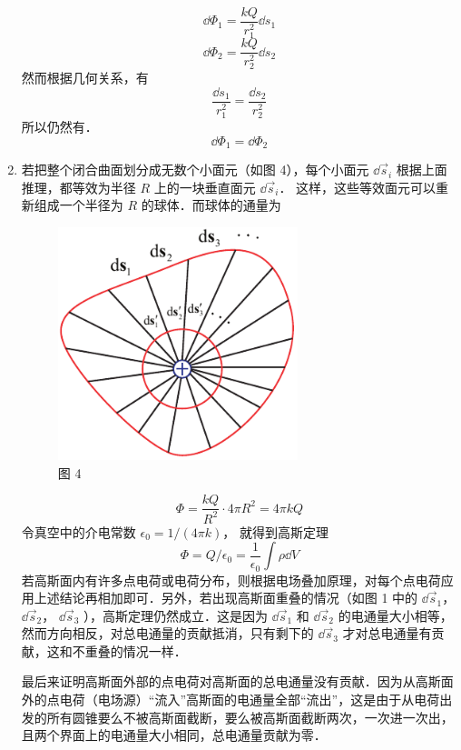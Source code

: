 \begin{enumerate}
\begin{equation}
\dd{\Phi_1} = \frac{kQ}{r_1^2} \dd{s_1}
\end{equation}
\begin{equation}
\dd{\Phi_2} = \frac{kQ}{r_2^2} \dd{s_2}
\end{equation}             
然而根据几何关系，有
\begin{equation}
\frac{\dd{s_1}}{r_1^2} = \frac{\dd{s_2}}{r_2^2}
\end{equation} 
所以仍然有．
\begin{equation}
\dd{\Phi_1} = \dd{\Phi_2}
\end{equation} 
\item 若把整个闭合曲面划分成无数个小面元（如图 4），每个小面元 $\dd{\vec s_i}$ 根据上面推理，都等效为半径 $R$ 上的一块垂直面元 $\dd{\vec s_i}$． 这样，这些等效面元可以重新组成一个半径为 $R$ 的球体．而球体的通量为
\begin{figure}[ht]
\centering
\includegraphics[width=7cm]{./figures/EGauss4.pdf}
\caption{图 4}
\end{figure}

\begin{equation}
\Phi  = \frac{kQ}{R^2} \cdot 4\pi R^2 = 4\pi kQ
\end{equation} 
令真空中的介电常数 $\epsilon_0 = 1/(4\pi k)$， 就得到高斯定理
\begin{equation}
\Phi  = Q/\epsilon_0 = \frac{1}{\epsilon_0} \int \rho \dd{V}
\end{equation} 
若高斯面内有许多点电荷或电荷分布，则根据电场叠加原理，对每个点电荷应用上述结论再相加即可．另外，若出现高斯面重叠的情况（如图 1 中的 $\dd{\vec s_1}$，  $\dd{\vec s_2}$，  $\dd{\vec s_3}$ ），高斯定理仍然成立．这是因为 $\dd{\vec s_1}$ 和 $\dd{\vec s_2}$ 的电通量大小相等，然而方向相反，对总电通量的贡献抵消，只有剩下的 $\dd{\vec s_3}$ 才对总电通量有贡献，这和不重叠的情况一样．

最后来证明高斯面外部的点电荷对高斯面的总电通量没有贡献．因为从高斯面外的点电荷（电场源）“流入”高斯面的电通量全部“流出”，这是由于从电荷出发的所有圆锥要么不被高斯面截断，要么被高斯面截断两次，一次进一次出，且两个界面上的电通量大小相同，总电通量贡献为零．
\end{enumerate}
 